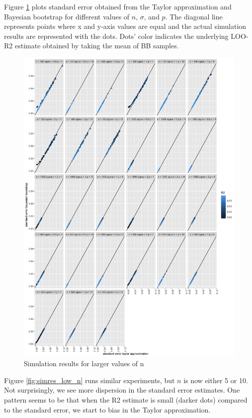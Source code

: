 \documentclass{article}
\begin{document}
Figure \ref{fig:simres} plots standard error obtained from the Taylor approximation and Bayesian bootstrap for different values of $n$, $\sigma$, and $p$. The diagonal line represents points where x and y-axis values are equal and the actual simulation results are represented with the dots. Dots' color indicates the underlying LOO-R2 estimate obtained by taking the mean of BB samples.
\begin{figure}
    \centering
    \includegraphics[width=\textwidth]{simres.png}
    \caption{ Simulation results for larger values of n}
    \label{fig:simres}
\end{figure}

Figure \ref{fig:simres_low_n} runs similar experiments, but $n$ is now either 5 or 10. Not surprisingly, we see more dispersion in the standard error estimates. One pattern seems to be that when the R2 estimate is small (darker dots) compared to the standard error, we start to bias in the Taylor approximation.
\end{document}
